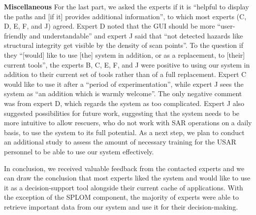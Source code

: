 \documentclass[conference,10pt,letter]{IEEEtran}
\begin{document}
\noindent \textbf{Miscellaneous} For the last part, we asked the experts if it is ``helpful to display the paths and [if it] provides additional information'', to which most experts (C, D, E, F, and J) agreed. Expert D noted that the GUI should be more ``user-friendly and understandable'' and expert J said that ``not detected hazards like structural integrity get visible by the density of scan points''. To the question if they ``[would] like to use [the] system in addition, or as a replacement, to [their] current tools'', the experts B, C, E, F, and J were positive to using our system in addition to their current set of tools rather than of a full replacement. Expert C would like to use it after a ``period of experimentation'', while expert J sees the system as ``an addition which is warmly welcome''. The only negative comment was from expert D, which regards the system as too complicated. Expert J also suggested possibilities for future work, suggesting that the system needs to be more intuitive to allow rescuers, who do not work with SAR operations on a daily basis, to use the system to its full potential. As a next step, we plan to conduct an additional study to assess the amount of necessary training for the USAR personnel to be able to use our system effectively.

In conclusion, we received valuable feedback from the contacted experts and we can draw the conclusion that most experts liked the system and would like to use it as a decision-support tool alongside their current cache of applications. With the exception of the SPLOM component, the majority of experts were able to retrieve important data from our system and use it for their decision-making.

\end{document}
